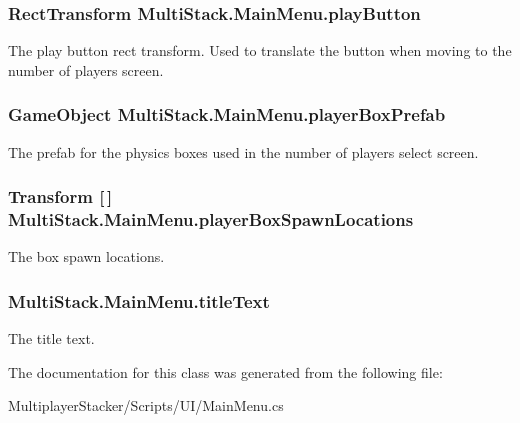 \subsubsection[{play\+Button}]{\setlength{\rightskip}{0pt plus 5cm}Rect\+Transform Multi\+Stack.\+Main\+Menu.\+play\+Button}\label{class_multi_stack_1_1_main_menu_ad0770c7731b1bc84fe9214e576f84b1c}


The play button rect transform. Used to translate the button when moving to the number of players screen. 

\hypertarget{class_multi_stack_1_1_main_menu_a423b9ab552b7a5e2068b33e8276931ea}{}
\subsubsection[{player\+Box\+Prefab}]{\setlength{\rightskip}{0pt plus 5cm}Game\+Object Multi\+Stack.\+Main\+Menu.\+player\+Box\+Prefab}\label{class_multi_stack_1_1_main_menu_a423b9ab552b7a5e2068b33e8276931ea}


The prefab for the physics boxes used in the number of players select screen. 

\hypertarget{class_multi_stack_1_1_main_menu_af217845475c893bd3d6269933a269892}{}
\subsubsection[{player\+Box\+Spawn\+Locations}]{\setlength{\rightskip}{0pt plus 5cm}Transform \mbox{[}$\,$\mbox{]} Multi\+Stack.\+Main\+Menu.\+player\+Box\+Spawn\+Locations}\label{class_multi_stack_1_1_main_menu_af217845475c893bd3d6269933a269892}


The box spawn locations. 

\hypertarget{class_multi_stack_1_1_main_menu_a6fd09504dbf98f1464f65e15d897e8e4}{}
\subsubsection[{title\+Text}]{ Multi\+Stack.\+Main\+Menu.\+title\+Text}\label{class_multi_stack_1_1_main_menu_a6fd09504dbf98f1464f65e15d897e8e4}


The title text. 



The documentation for this class was generated from the following file\+:\begin{DoxyCompactItemize}
\item 
Multiplayer\+Stacker/\+Scripts/\+U\+I/Main\+Menu.\+cs\end{DoxyCompactItemize}
